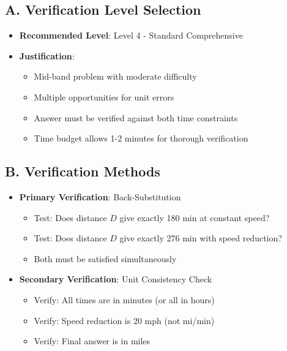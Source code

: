\documentclass[11pt]{article}
\begin{document}
\begin{verificationbox}
\subsection*{A. Verification Level Selection}
\begin{itemize}[leftmargin=*]
    \item \textbf{Recommended Level}: Level 4 - Standard Comprehensive
    
    \item \textbf{Justification}:
    \begin{itemize}[leftmargin=*]
        \item Mid-band problem with moderate difficulty
        \item Multiple opportunities for unit errors
        \item Answer must be verified against both time constraints
        \item Time budget allows 1-2 minutes for thorough verification
    \end{itemize}
\end{itemize}

\subsection*{B. Verification Methods}
\begin{itemize}[leftmargin=*]
    \item \textbf{Primary Verification}: Back-Substitution
    \begin{itemize}[leftmargin=*]
        \item Test: Does distance $D$ give exactly 180 min at constant speed?
        \item Test: Does distance $D$ give exactly 276 min with speed reduction?
        \item Both must be satisfied simultaneously
    \end{itemize}
    
    \item \textbf{Secondary Verification}: Unit Consistency Check
    \begin{itemize}[leftmargin=*]
        \item Verify: All times are in minutes (or all in hours)
        \item Verify: Speed reduction is 20 mph (not mi/min)
        \item Verify: Final answer is in miles
    \end{itemize}
    

\end{itemize}
\end{verificationbox}
\end{document}
